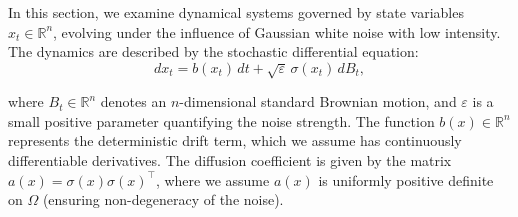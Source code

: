 \documentclass[11pt]{article}
\theoremstyle{plain}      %
\theoremstyle{definition} %
\begin{document}
In this section, we examine dynamical systems governed by state variables \( x_t \in \mathbb{R}^n \), evolving under the influence of Gaussian white noise with low intensity. The dynamics are described by the stochastic differential equation:
\begin{equation}
\label{sde}
dx_t = b(x_t)\,dt + \sqrt{\varepsilon}\,\sigma(x_t)\,dB_t,
\end{equation}

where $B_t \in \mathbb{R}^n$ denotes an $n$-dimensional standard Brownian motion, and $\varepsilon$ is a small positive parameter quantifying the noise strength. The function $b(x) \in \mathbb{R}^n$ represents the deterministic drift term, which we assume has continuously differentiable derivatives. The diffusion coefficient is given by the matrix $a(x) = \sigma(x)\sigma(x)^\top$, where we assume $a(x)$ is uniformly positive definite on $\Omega$ (ensuring non-degeneracy of the noise).
\end{document}
